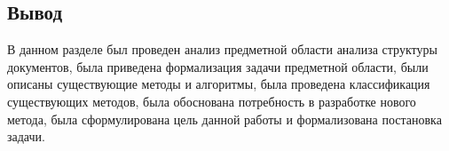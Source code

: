 \subsection*{Вывод}

В данном разделе был проведен анализ предметной области анализа структуры документов, была приведена формализация задачи предметной области, были описаны существующие методы и алгоритмы, была проведена классификация существующих методов, была обоснована потребность в разработке нового метода, была сформулирована цель данной работы и формализована постановка задачи.
